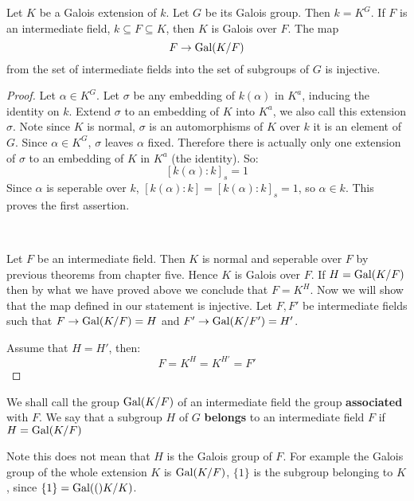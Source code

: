 \begin{theorem}\label{1.2}
    Let $K$ be a Galois extension of $k$. Let $G$ be its Galois group. Then $k=K^G$. If $F$ is an intermediate field, $k\subseteq F\subseteq K$, then $K$ is Galois over $F$. The map\[F\rightarrow \text{Gal}(K/F)\]from the set of intermediate fields into the set of subgroups of $G$ is injective.

    \begin{proof}
        Let $\alpha\in K^G$. Let $\sigma$ be any embedding of $k(\alpha)$ in $K^a$, inducing the identity on $k$. Extend $\sigma$ to an embedding of $K$ into $K^a$, we also call this extension $\sigma$. Note since $K$ is normal, $\sigma$ is an automorphisms of $K$ over $k$ it is an element of $G$. Since $\alpha\in K^G$, $\sigma$ leaves $\alpha$ fixed. Therefore there is actually only one extension of $\sigma$ to an embedding of $K$ in $K^a$ (the identity). So:\[{[k(\alpha)\colon k]}_s = 1 \] 
        Since $\alpha$ is seperable over $k$, $[k(\alpha)\colon k] = {[k(\alpha)\colon k]}_s = 1$, so $\alpha\in k$. This proves the first assertion.

        \

        Let $F$ be an intermediate field. Then $K$ is normal and seperable over $F$ by previous theorems from chapter five. Hence $K$ is Galois over $F$. If $H = \text{Gal}(K/F)$ then by what we have proved above we conclude that $F = K^H$. Now we will show that the map defined in our statement is injective. Let $F,F'$ be intermediate fields such that $F\rightarrow \text{Gal}(K/F) = H$ and $F'\rightarrow \text{Gal}(K/F') = H'$.

        Assume that $H=H'$, then:\begin{equation*}
            F = K^H = K^{H'} = F'
        \end{equation*}
    \end{proof}
\end{theorem} 
    \begin{definition}
        We shall call the group $\text{Gal}(K/F)$ of an intermediate field the group \textbf{associated} with $F$. We say that a subgroup $H$ of $G$ \textbf{belongs} to an intermediate field $F$ if $H = \text{Gal}(K/F)$
       \begin{bergman}
        Note this does not mean that $H$ is the Galois group of $F$. For example the Galois group of the whole extension $K$ is $\text{Gal}(K/F)$, $\{1\}$ is the subgroup belonging to $K$, since $\{1\} = \text{Gal}(()K/K)$.
    \end{bergman}
    \end{definition}

